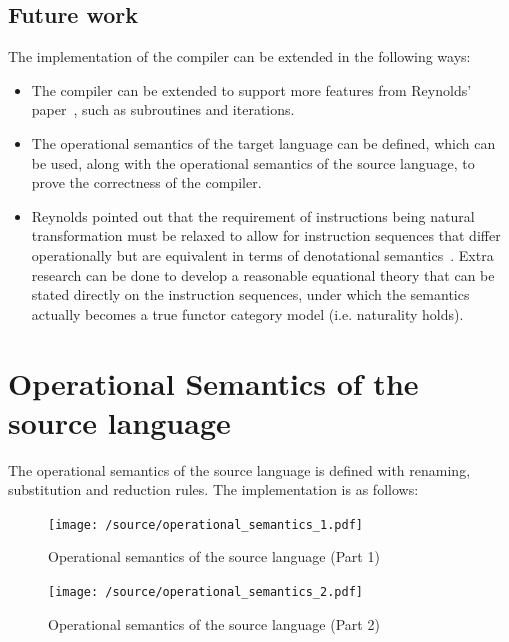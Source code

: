 \documentclass[12pt,a4paper]{report}
\makeatletter
\theoremstyle{definition}
\newcommand{\chapterminitoc}{%
  \begingroup
    \let\ps@plain\ps@empty %
    \let\ps@headings\ps@empty
    \minitoc
    \thispagestyle{empty} %
    \afterpage{\clearpage} %
  \endgroup
    \clearpage
  \addtocounter{page}{-1} %
}
\makeatother
\begin{document}
    \section{Future work}
    The implementation of the compiler can be extended in the following ways:
    \begin{itemize}
        \item 
            The compiler can be extended to support more features from Reynolds' paper~\autocite{Reynolds}, such as subroutines and iterations.
        \item
            The operational semantics of the target language can be defined, which can be used, along with the operational semantics of the source language, to prove the correctness of the compiler.
        \item
            Reynolds pointed out that the requirement of instructions being natural transformation must be relaxed to allow for instruction sequences that differ operationally but are equivalent in terms of denotational semantics~\autocite[Ch. 6]{Reynolds}. Extra research can be done to develop a reasonable equational theory that can be stated directly on the instruction sequences, under which the semantics actually becomes a true functor category model (i.e. naturality holds).
    \end{itemize}

\printbibliography

\appendix

\chapter{Operational Semantics of the source language} \label{app: operational_semantics}
    \chapterminitoc
    The operational semantics of the source language is defined with renaming, substitution and reduction rules. The implementation is as follows:
    \begin{figure}[H]
        \centering
        \texttt{[image: /source/operational\_semantics\_1.pdf]}
        \caption{Operational semantics of the source language (Part 1)}
        \label{fig: operational_semantics_1}
    \end{figure}
    \begin{figure}[H]
        \centering
        \texttt{[image: /source/operational\_semantics\_2.pdf]}
        \caption{Operational semantics of the source language (Part 2)}
        \label{fig: operational_semantics_2}
    \end{figure}


\cleardoublepage
\let\cleardoublepage\clearpage
\pagestyle{empty}

\AtBeginShipoutNext{\AtBeginShipoutDiscard}
\end{document}
